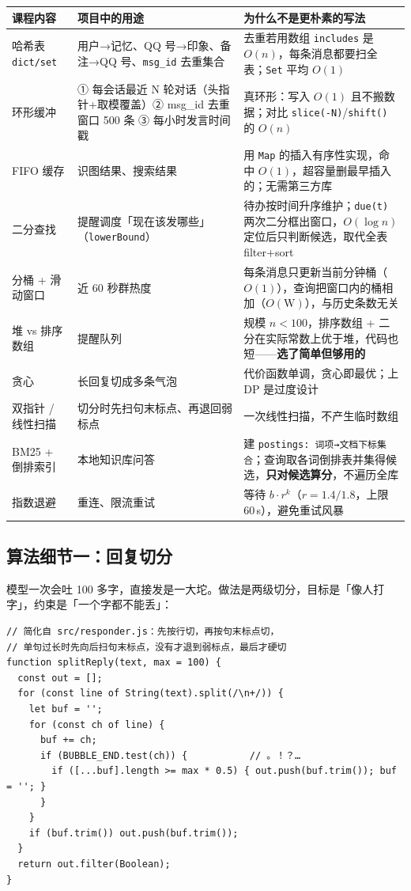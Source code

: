 \documentclass[11pt,a4paper]{ctexart}
\begin{document}
\begin{table}[H]
\centering\footnotesize
\begin{tabularx}{\textwidth}{@{}p{2.6cm}p{5.2cm}X@{}}
\toprule
课程内容 & 项目中的用途 & 为什么不是更朴素的写法 \\
\midrule
哈希表 \texttt{dict/set} & 用户→记忆、QQ 号→印象、备注→QQ 号、\texttt{msg\_id} 去重集合 & 去重若用数组 \texttt{includes} 是 $O(n)$，每条消息都要扫全表；\texttt{Set} 平均 $O(1)$ \\
环形缓冲 & ① 每会话最近 N 轮对话（头指针+取模覆盖）② msg\_id 去重窗口 500 条 ③ 每小时发言时间戳 & 真环形：写入 $O(1)$ 且不搬数据；对比 \texttt{slice(-N)}/\texttt{shift()} 的 $O(n)$ \\
FIFO 缓存 & 识图结果、搜索结果 & 用 \texttt{Map} 的插入有序性实现，命中 $O(1)$，超容量删最早插入的；无需第三方库 \\
二分查找 & 提醒调度「现在该发哪些」（\texttt{lowerBound}） & 待办按时间升序维护；\texttt{due(t)} 两次二分框出窗口，$O(\log n)$ 定位后只判断候选，取代全表 filter+sort \\
分桶 + 滑动窗口 & 近 60 秒群热度 & 每条消息只更新当前分钟桶（$O(1)$），查询把窗口内的桶相加（$O(\mathrm{W})$），与历史条数无关 \\
堆 vs 排序数组 & 提醒队列 & 规模 $n<100$，排序数组 + 二分在实际常数上优于堆，代码也短——\textbf{选了简单但够用的} \\
贪心 & 长回复切成多条气泡 & 代价函数单调，贪心即最优；上 DP 是过度设计 \\
双指针 / 线性扫描 & 切分时先扫句末标点、再退回弱标点 & 一次线性扫描，不产生临时数组 \\
BM25 + 倒排索引 & 本地知识库问答 & 建 \texttt{postings: 词项→文档下标集合}；查询取各词倒排表并集得候选，\textbf{只对候选算分}，不遍历全库 \\
指数退避 & 重连、限流重试 & 等待 $b\cdot r^k$（$r=1.4/1.8$，上限 60\,s），避免重试风暴 \\
\bottomrule
\end{tabularx}
\end{table}

\subsection{算法细节一：回复切分}

模型一次会吐 100 多字，直接发是一大坨。做法是两级切分，目标是「像人打字」，约束是「一个字都不能丢」：

\begin{lstlisting}
// 简化自 src/responder.js：先按行切，再按句末标点切，
// 单句过长时先向后扫句末标点，没有才退到弱标点，最后才硬切
function splitReply(text, max = 100) {
  const out = [];
  for (const line of String(text).split(/\n+/)) {
    let buf = '';
    for (const ch of line) {
      buf += ch;
      if (BUBBLE_END.test(ch)) {           // 。！？…
        if ([...buf].length >= max * 0.5) { out.push(buf.trim()); buf = ''; }
      }
    }
    if (buf.trim()) out.push(buf.trim());
  }
  return out.filter(Boolean);
}
\end{lstlisting}
\end{document}
